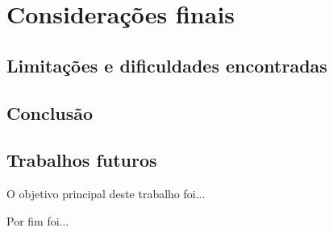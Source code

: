 \chapter{Considera\c{c}\~oes finais}

\section{Limita\c{c}\~oes e dificuldades encontradas}

\section{Conclus\~ao}

\section{Trabalhos futuros}

O objetivo principal deste trabalho foi...

Por fim foi...